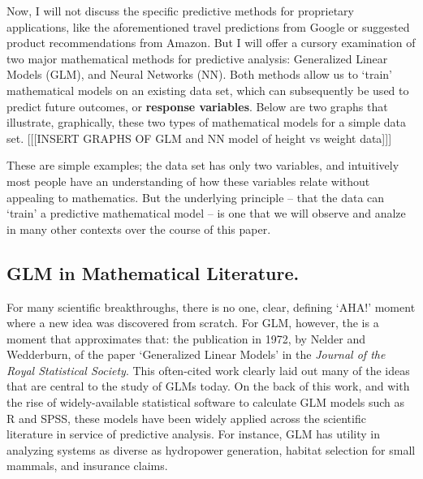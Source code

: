 \documentclass[12pt]{article}
\begin{document}
Now, I will not discuss the specific predictive methods for proprietary applications, like the aforementioned travel predictions from Google or 
suggested product recommendations from Amazon.  But I will offer a cursory examination of two major mathematical methods for predictive analysis:
Generalized Linear Models (GLM), and Neural Networks (NN).  Both methods allow us to `train' mathematical models on an existing data set, which can
subsequently be used to predict future outcomes, or \textbf{response variables}.  Below are two graphs that illustrate, graphically, these two
types of mathematical models for a simple data set.  [[[INSERT GRAPHS OF GLM and NN model of height vs weight data]]]


These are simple examples; the data set has only two variables, and intuitively most people have an understanding of how these variables relate 
without appealing to mathematics.  But the underlying principle -- that the data can `train' a predictive mathematical model -- is one that we will
observe and analze in many other contexts over the course of this paper.


	\subsection{GLM in Mathematical Literature.}
		For many scientific breakthroughs, there is no one, clear, defining `AHA!' moment where a new idea was discovered from scratch. For
GLM, however, the is a moment that approximates that: the publication in 1972, by Nelder and Wedderburn, of the paper `Generalized Linear Models'
in the \textit{Journal of the Royal Statistical Society}.  This often-cited work clearly laid out many of the ideas that are central to the study 
of GLMs today.  On the back of this work, and with the rise of widely-available statistical software to calculate GLM models such as R and SPSS, 
these models have been widely applied across the scientific literature in service of predictive analysis.  For instance, GLM has utility in
analyzing systems as diverse as hydropower generation, habitat selection for small mammals, and insurance claims.  
\end{document}
